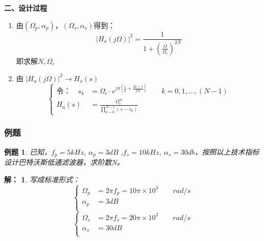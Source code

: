 \documentclass[notheorems,compress,mathserif,table]{beamer}
\newtheorem{example}{例题}
\newtheorem{answer}{解：}
\newtheorem{dablock}{}
\begin{document}
\begin{frame}\frametitle{}%
\textbf{\heiti 二、设计过程}

\begin{enumerate}
\item  由$(\Omega_{p},\alpha_{p})$，$(\Omega_{s},\alpha_{s})$得到：
      $$|H_{a}(j\Omega)|^{2}= \frac{1}{1+(\frac{\Omega}{\Omega_{c}})^{2N}}$$
      即求解$N,\Omega_{c}$
  \item   由
  $|H_a(j\Omega)|^{2}\longrightarrow H_{a}(s)$
      $$
        \left\{ \begin{aligned}
            \mbox{令：}\quad s_{k} &=\Omega_{c}\cdot e^{j\pi\left[\frac{1}{2}+\frac{2k+1}{2N}\right]}  \quad\quad k=0,1,...,(N-1) \\
            H_{a}(s) &= \frac{\Omega_{c}^{N}}{\prod^{N-1}_{k=0}(s-s_{k})}
        \end{aligned} \right.
      $$
\end{enumerate}
\end{frame}


\begin{frame}\frametitle{例题}%
\begin{example}
已知，$f_p=5kHz$, $\alpha_p=3dB$ ,$f_s=10kHz$, $\alpha_s=30db$，按照以上技术指标设计巴特沃斯低通滤波器，求阶数N。
\end{example}
\begin{answer}
写成标准形式：
$$
\left\{
\begin{aligned}
\Omega_{p}  &=2\pi f_p= 10\pi \times 10^{3} \quad\quad rad/s\\
\alpha_{p}  &= 3 dB\quad\quad\quad\quad\quad\quad\quad\\
\end{aligned}
\right.
$$
$$
\left\{
\begin{aligned}
\Omega_{s}  &=2\pi f_s= 20\pi \times 10^{3} \quad\quad rad/s\\
\alpha_{s}  &= 30 dB\quad\quad\quad\quad\quad\quad\quad\\
\end{aligned}
\right.
$$

\end{answer}
\end{frame}
\end{document}
